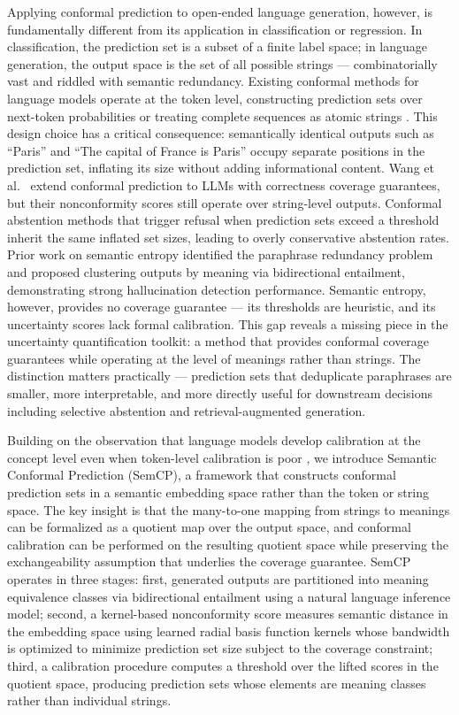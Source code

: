 \documentclass{article}
\begin{document}
Applying conformal prediction to open-ended language generation, however, is fundamentally different from its application in classification or regression. In classification, the prediction set is a subset of a finite label space; in language generation, the output space is the set of all possible strings --- combinatorially vast and riddled with semantic redundancy. Existing conformal methods for language models operate at the token level, constructing prediction sets over next-token probabilities or treating complete sequences as atomic strings \cite{quach2023conformal}. This design choice has a critical consequence: semantically identical outputs such as ``Paris'' and ``The capital of France is Paris'' occupy separate positions in the prediction set, inflating its size without adding informational content. Wang et al.\ \cite{wang2024conu} extend conformal prediction to LLMs with correctness coverage guarantees, but their nonconformity scores still operate over string-level outputs. Conformal abstention methods that trigger refusal when prediction sets exceed a threshold \cite{yadkori2024mitigating} inherit the same inflated set sizes, leading to overly conservative abstention rates. Prior work on semantic entropy identified the paraphrase redundancy problem and proposed clustering outputs by meaning via bidirectional entailment, demonstrating strong hallucination detection performance. Semantic entropy, however, provides no coverage guarantee --- its thresholds are heuristic, and its uncertainty scores lack formal calibration. This gap reveals a missing piece in the uncertainty quantification toolkit: a method that provides conformal coverage guarantees while operating at the level of meanings rather than strings. The distinction matters practically --- prediction sets that deduplicate paraphrases are smaller, more interpretable, and more directly useful for downstream decisions including selective abstention \cite{feng2024dont} and retrieval-augmented generation.

Building on the observation that language models develop calibration at the concept level even when token-level calibration is poor \cite{nakkiran2025trained}, we introduce Semantic Conformal Prediction (SemCP), a framework that constructs conformal prediction sets in a semantic embedding space rather than the token or string space. The key insight is that the many-to-one mapping from strings to meanings can be formalized as a quotient map over the output space, and conformal calibration can be performed on the resulting quotient space while preserving the exchangeability assumption that underlies the coverage guarantee. SemCP operates in three stages: first, generated outputs are partitioned into meaning equivalence classes via bidirectional entailment using a natural language inference model; second, a kernel-based nonconformity score measures semantic distance in the embedding space using learned radial basis function kernels whose bandwidth is optimized to minimize prediction set size subject to the coverage constraint; third, a calibration procedure computes a threshold over the lifted scores in the quotient space, producing prediction sets whose elements are meaning classes rather than individual strings.
\end{document}
